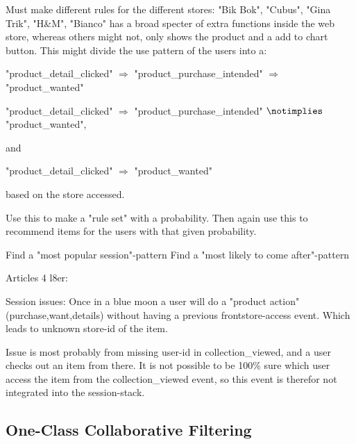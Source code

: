 Must make different rules for the different stores:
"Bik Bok", "Cubus", "Gina Trik", "H\&M", "Bianco" has a broad specter of extra
functions inside the web store, whereas others might not, only shows the
product and a add to chart button.  This might divide the use pattern of the
users into a:

"product\_detail\_clicked" $\Rightarrow$ "product\_purchase\_intended" $\Rightarrow$ "product\_wanted"

"product\_detail\_clicked" $\Rightarrow$ "product\_purchase\_intended" $\notimplies$ "product\_wanted",

and

"product\_detail\_clicked" $\Rightarrow$ "product\_wanted"

based on the store accessed.

Use this to make a "rule set" with a probability.
Then again use this to recommend items for the users with that given
probability.

Find a "most popular session"-pattern
Find a "most likely to come after"-pattern

Articles 4 l8er:

Session issues:
Once in a blue moon a user will do a "product action" (purchase,want,details)
without having a previous frontstore-access event. Which leads to unknown
store-id of the item.

Issue is most probably from missing user-id in collection\_viewed, and a user
checks out an item from there. It is not possible to be 100\% sure which user
access the item from the collection\_viewed event, so this event is therefor
not integrated into the session-stack.

\subsection{One-Class Collaborative Filtering}
